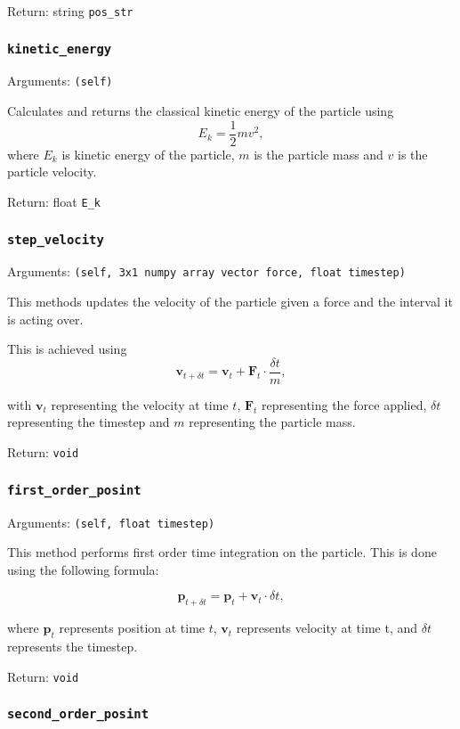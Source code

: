 \documentclass[a4paper, 11pt, british, left=1in, right=1in, top=0.3in, bottom=1in]{article}
\begin{document}
	Return: string \texttt{pos\_str}
	
	\subsubsection{\texttt{kinetic\_energy}}
	
	Arguments: \texttt{(self)}
	
	Calculates and returns the classical kinetic energy of the particle using $$E_k = \dfrac{1}{2}mv^2,$$ where $E_k$ is kinetic energy of the particle, $m$ is the particle mass and $v$ is the particle velocity.
	
	Return: float \texttt{E\_k}
	
	\subsubsection{\texttt{step\_velocity}}
	
	Arguments: \texttt{(self, 3x1 numpy array vector force, float timestep)}
	
	This methods updates the velocity of the particle given a force and the interval it is acting over. 
	
	This is achieved using $$\textbf{v}_{t+\delta t} = \textbf{v}_t + \textbf{F}_t\cdot\frac{\delta t}{m},$$
	
	with $\textbf{v}_t$ representing the velocity at time $t$, $\textbf{F}_t$ representing the force applied, $\delta t$ representing the timestep and $m$ representing the particle mass. 
	
	Return: \texttt{void}
	
	\subsubsection{\texttt{first\_order\_posint}}
	
	Arguments: \texttt{(self, float timestep)}
	
	This method performs first order time integration on the particle. This is done using the following formula:
	
	$$\textbf{p}_{t+\delta t} = \textbf{p}_t + \textbf{v}_t \cdot \delta t, $$
	
	where $\textbf{p}_t$ represents position at time $t$, $\textbf{v}_t$ represents velocity at time t, and $\delta t$ represents the timestep. 
	
	Return: \texttt{void}	
	
	\subsubsection{\texttt{second\_order\_posint}}
	
\end{document}
